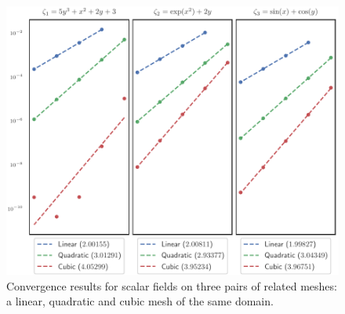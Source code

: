 \begin{figure}
  \includegraphics{../images/solution-transfer/main_figure25.pdf}
  \centering
  \captionsetup{width=.75\linewidth}
  \caption{Convergence results for scalar fields on three pairs of related
    meshes: a linear, quadratic and cubic mesh of the same domain.}
  \label{fig:composite-errors}
\end{figure}

